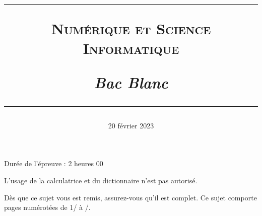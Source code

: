 \documentclass[a4paper, 11pt]{article}
\title{
  \rule{\linewidth}{0.8pt}
  \Large{\scshape{\textbf{Numérique et Science Informatique}}}

  \vspace{0.5cm}
  \large{\textit{Bac Blanc}}

  \rule[10pt]{\linewidth}{0.8pt}
    }
\author{}
\date{20 février 2023}
\begin{document}
\maketitle
\thispagestyle{fancy}


\begin{center}
  Durée de l'épreuve : 2 heures 00
\end{center}

\vspace*{1cm}

L'usage de la calculatrice et du dictionnaire n'est pas autorisé.

Dès que ce sujet vous est remis, assurez-vous qu'il est complet.
Ce sujet comporte \pageref{LastPage} pages numérotées de 1/\pageref{LastPage} à \pageref{LastPage}/\pageref{LastPage}.

\vfill
{}

\vspace{0.5cm}


\vfill

\newpage
\end{document}
